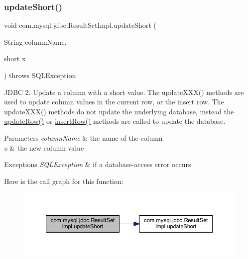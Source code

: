 \subsubsection{\texorpdfstring{update\+Short()}{updateShort()}\hspace{0.1cm}{\footnotesize\ttfamily [2/2]}}
{\footnotesize\ttfamily void com.\+mysql.\+jdbc.\+Result\+Set\+Impl.\+update\+Short (\begin{DoxyParamCaption}\item[{String}]{column\+Name,  }\item[{short}]{x }\end{DoxyParamCaption}) throws S\+Q\+L\+Exception}

J\+D\+BC 2. Update a column with a short value. The update\+X\+X\+X() methods are used to update column values in the current row, or the insert row. The update\+X\+X\+X() methods do not update the underlying database, instead the \mbox{\hyperlink{classcom_1_1mysql_1_1jdbc_1_1_result_set_impl_a2842d32292d023aaeeafedeed3322981}{update\+Row()}} or \mbox{\hyperlink{classcom_1_1mysql_1_1jdbc_1_1_result_set_impl_a78e304e3279cbcf60392f18c1385e3bf}{insert\+Row()}} methods are called to update the database.


\begin{DoxyParams}{Parameters}
{\em column\+Name} & the name of the column \\
\hline
{\em x} & the new column value\\
\hline
\end{DoxyParams}

\begin{DoxyExceptions}{Exceptions}
{\em S\+Q\+L\+Exception} & if a database-\/access error occurs \\
\hline
\end{DoxyExceptions}
Here is the call graph for this function\+:
\nopagebreak
\begin{figure}[H]
\begin{center}
\leavevmode
\includegraphics[width=350pt]{classcom_1_1mysql_1_1jdbc_1_1_result_set_impl_a0d4de94cc75212c90c107188c0193456_cgraph}
\end{center}
\end{figure}
\mbox{\label{classcom_1_1mysql_1_1jdbc_1_1_result_set_impl_a2e10fbf310a4ce03868caa68bc786a34}} 
